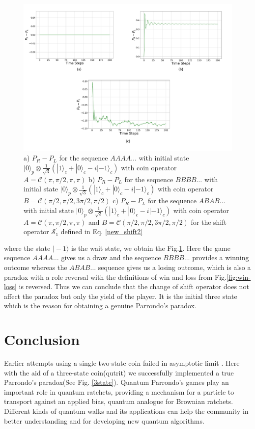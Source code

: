 \documentclass[english,aps,pra,amsmath,amssymb,showpacs,notitlepage,onecolumn]{revtex4-1}
\begin{document}
\begin{figure}
\includegraphics[scale=0.65]{diff_shift.pdf}
 \caption{a) $P_R -P_L$ for the sequence $AAAA\ldots$ with initial state $| 0 \rangle_p \otimes \frac{1}{\sqrt{3}}(| 1 \rangle_c + | 0 \rangle_c - i | -1 \rangle_c)$ with coin operator $A = \mathcal{C}(\pi, \pi/2, \pi, \pi)$  b) $P_R -P_L$ for the sequence $BBBB\ldots$ with initial state $| 0 \rangle_p \otimes \frac{1}{\sqrt{3}}(| 1 \rangle_c + | 0 \rangle_c - i| -1 \rangle_c)$ with coin operator $B = \mathcal{C}(\pi/2, \pi/2, 3\pi/2, \pi/2)$ c) $P_R -P_L$ for the sequence $ABAB\ldots$ with initial state $| 0 \rangle_p \otimes \frac{1}{\sqrt{3}}(| 1 \rangle_c + | 0 \rangle_c - i| -1 \rangle_c)$ with coin operator $A = \mathcal{C}(\pi, \pi/2, \pi, \pi)$ and $B = \mathcal{C}(\pi/2, \pi/2, 3\pi/2, \pi/2)$ for the shift operator $\mathcal{S^{\prime}_\texttt{1}}$ defined in Eq. \ref{new_shift2}}\label{shift2}
\end{figure}

where the state $\vert -1 \rangle$ is the wait state, we obtain the Fig.\ref{shift2}. Here the game sequence $AAAA\ldots$ gives us a draw and the sequence $BBBB\ldots$ provides a winning outcome whereas the $ABAB\ldots$ sequence gives us a losing outcome, which is also a paradox with a role reversal with the definitions of win and loss from Fig.\ref{fig:win-loss} is reversed. Thus we can conclude that the change of shift operator does not affect the paradox but only the yield of the player. It is the initial three state which is the reason for obtaining a genuine Parrondo's paradox.   


\section{Conclusion}\label{conclusion}
Earlier attempts using a single two-state coin failed in asymptotic limit \cite{minli,flitney}. Here with the aid of a three-state coin(qutrit) we successfully implemented a true Parrondo's paradox(See Fig. \ref{3state}). Quantum Parrondo's games play an important role in quantum ratchets, providing a mechanism for a particle to transport against an applied bias, quantum analogue for Brownian ratchets. Different kinds of quantum walks and its applications can help the community in better understanding and for developing new quantum algorithms.
\end{document}

